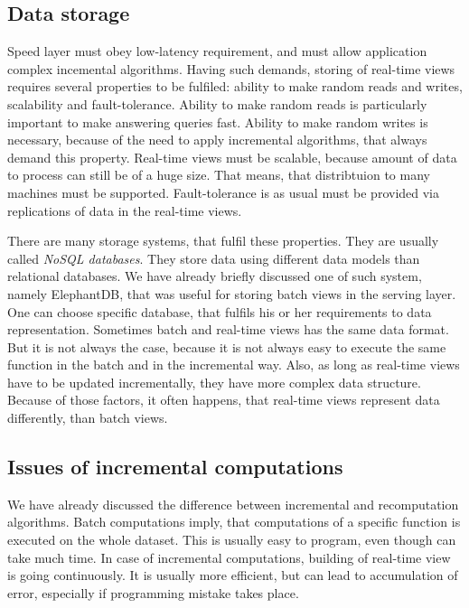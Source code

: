 \subsection{Data storage}

Speed layer must obey low-latency requirement, and must allow application complex incemental algorithms.
Having such demands, storing of real-time views requires several properties to be fulfiled: ability to make random reads and writes, scalability and fault-tolerance.
Ability to make random reads is particularly important to make answering queries fast.
Ability to make random writes is necessary, because of the need to apply incremental algorithms, that always demand this property.
Real-time views must be scalable, because amount of data to process can still be of a huge size.
That means, that distribtuion to many machines must be supported.
Fault-tolerance is as usual must be provided via replications of data in the real-time views.

There are many storage systems, that fulfil these properties.
They are usually called \textit{NoSQL databases}.
They store data using different data models than relational databases.
We have already briefly discussed one of such system, namely ElephantDB, that was useful for storing batch views in the serving layer.
One can choose specific database, that fulfils his or her requirements to data representation.
Sometimes batch and real-time views has the same data format.
But it is not always the case, because it is not always easy to execute the same function in the batch and in the incremental way.
Also, as long as real-time views have to be updated incrementally, they have more complex data structure.
Because of those factors, it often happens, that real-time views represent data differently, than batch views.

\subsection{Issues of incremental computations}

We have already discussed the difference between incremental and recomputation algorithms.
Batch computations imply, that computations of a specific function is executed on the whole dataset.
This is usually easy to program, even though can take much time.
In case of incremental computations, building of real-time view is going continuously.
It is usually more efficient, but can lead to accumulation of error, especially if programming mistake takes place.

